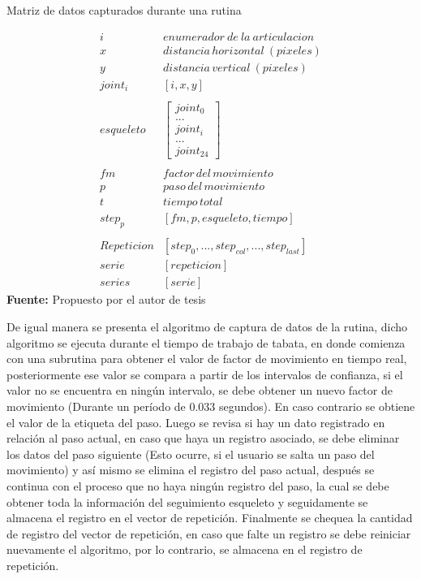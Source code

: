 \begin{formula}[H]
	\centering
	\caption{Matriz de datos capturados durante una rutina}
	\label{frm:MatrizDatosRepeticion}
	\begin{equation}
\begin{matrix}
i & enumerador\: de\: la\: articulacion \\ 
x & distancia\, horizontal \: (pixeles) \\ 
y & distancia\, vertical\: (pixeles) \\ 
joint_{i}& [i,x,y] \\ 
 & \\ 
esqueleto & \begin{bmatrix}
joint_{0} \\ 
... \\ 
joint_{i}\\ 
... \\ 
joint_{24}
\end{bmatrix}  \\ 
 & \\ 
fm & factor \, del \, movimiento \\ 
p  & paso \, del \,movimiento \\ 
t  & tiempo \, total \\ 
step_{p}  & [fm,p,esqueleto, tiempo] \\
 & \\ 
Repeticion & [step_{0}, ...,  step_{col}, ..., step_{last}] \\
serie & [repeticion] \\
series & [serie]
\end{matrix}
	\end{equation}
	\textbf{Fuente:} Propuesto por el autor de tesis
\end{formula}
De igual manera se presenta el algoritmo de captura de datos de la rutina, dicho algoritmo se ejecuta durante el tiempo de trabajo de tabata, en donde comienza con una subrutina para obtener el valor de factor de movimiento en tiempo real, posteriormente ese valor se compara a partir de los intervalos de confianza, si el valor no se encuentra en ning\'un intervalo, se debe obtener un nuevo factor de movimiento (Durante un per\'iodo de 0.033 segundos). En caso contrario se obtiene el valor de la etiqueta del paso. Luego se revisa si hay un dato registrado en relaci\'on al paso actual, en caso que haya un registro asociado, se debe eliminar los datos del paso siguiente (Esto ocurre, si el usuario se salta un paso del movimiento) y as\'i mismo se elimina el registro del paso actual, despu\'es se continua con el proceso que no haya ning\'un registro del paso, la cual se debe obtener toda la informaci\'on del seguimiento esqueleto y seguidamente se almacena el registro en el vector de repetici\'on. Finalmente se chequea la cantidad de registro del  vector de repetici\'on, en caso que falte un registro se debe reiniciar nuevamente el algoritmo, por lo contrario, se almacena en el registro de repetici\'on.
